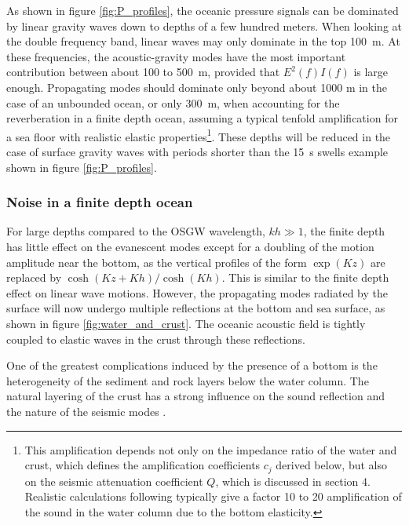 As shown in figure \ref{fig:P_profiles}, the oceanic pressure signals can be dominated by linear gravity waves down to 
depths of a few hundred
meters. When looking at the double frequency band, linear waves may only dominate in the top 100~m. 
At these frequencies, the acoustic-gravity modes have the 
most important contribution between about 100 to 500~m, provided that $E^2(f) I(f)$ is large enough. Propagating modes 
should dominate only beyond about 1000 m in the case of an unbounded ocean, or only 300~m, when 
accounting for the reverberation in a finite depth ocean, assuming a typical tenfold amplification for a sea floor with realistic elastic 
properties\footnote{This amplification depends not only on the impedance ratio of the water and crust, which defines 
the amplification coefficients $c_j$ derived below, but also on the seismic attenuation coefficient $Q$, which is discussed in section 4. Realistic calculations following \cite{Ardhuin&al.2011} typically give a
factor 10 to 20 amplification of the sound in the water column due to the bottom elasticity.}. These depths will be reduced in the case 
of surface gravity waves with periods  shorter than the 15~s swells example shown in figure  \ref{fig:P_profiles}.

\subsubsection{Noise in a finite depth ocean}
For large depths compared to the OSGW wavelength, $kh \gg 1$, the finite depth 
has little effect on the evanescent modes except
for a doubling of the motion amplitude near the bottom, as the vertical profiles of the form 
$\exp(K z)$ are replaced by $\cosh(K z+K h)/\cosh(K h)$. This is similar to the finite depth effect 
on  linear wave motions. 
However, the propagating modes  radiated by the surface will now undergo multiple reflections at the bottom and sea surface, 
as shown in figure \ref{fig:water_and_crust}. The oceanic acoustic field is tightly coupled 
to elastic waves in the crust through these reflections.

One of the greatest complications induced by the presence of a bottom is the heterogeneity of  
the sediment and rock layers below the water column. 
The natural layering of the crust has a strong influence on the sound reflection and 
the nature of the seismic modes \citep[e.g.][]{Latham&Sutton1966,Abramovici1968}. 






